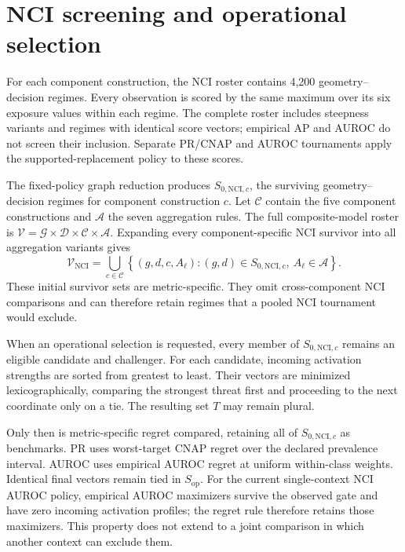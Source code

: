 \documentclass[11pt]{article}
\begin{document}
\newpage
\appendix

\section{NCI screening and operational selection}
\label{app:nci-selection}

For each component construction, the NCI roster contains 4,200
geometry--decision regimes. Every observation is scored by the same maximum
over its six exposure values within each regime. The complete roster includes
steepness variants and regimes with identical score vectors; empirical AP and
AUROC do not screen their inclusion. Separate PR/CNAP and AUROC tournaments
apply the supported-replacement policy to these scores.

The fixed-policy graph reduction produces \(S_{0,\mathrm{NCI},c}\), the
surviving geometry--decision regimes for component construction \(c\).
Let \(\mathcal{C}\) contain the five component constructions and
\(\mathcal{A}\) the seven aggregation rules. The full composite-model roster is
\(\mathcal{V}=\mathcal{G}\times\mathcal{D}\times\mathcal{C}\times\mathcal{A}\).
Expanding every component-specific NCI survivor into all aggregation variants
gives
\begin{equation}
\mathcal{V}_{\mathrm{NCI}}
=\bigcup_{c\in\mathcal{C}}
\left\{(g,d,c,A_{\ell}):
(g,d)\in S_{0,\mathrm{NCI},c},\ A_{\ell}\in\mathcal{A}\right\}.
\label{eq:nci_expansion}
\end{equation}
These initial survivor sets are metric-specific. They omit cross-component
NCI comparisons and can therefore retain regimes that a pooled NCI tournament
would exclude.

When an operational selection is requested, every member of
\(S_{0,\mathrm{NCI},c}\) remains an eligible candidate and challenger. For each candidate, incoming activation
strengths are sorted from greatest to least. Their vectors are minimized
lexicographically, comparing the strongest threat first and proceeding to the
next coordinate only on a tie. The resulting set \(T\) may remain plural.

Only then is metric-specific regret compared, retaining all of
\(S_{0,\mathrm{NCI},c}\) as benchmarks. PR uses worst-target CNAP regret over
the declared prevalence interval. AUROC uses empirical AUROC regret at uniform
within-class weights. Identical final vectors remain tied in \(S_{\mathrm{op}}\).
For the current single-context NCI AUROC policy, empirical AUROC maximizers
survive the observed gate and have zero incoming activation profiles; the
regret rule therefore retains those maximizers. This property does not extend
to a joint comparison in which another context can exclude them.
\end{document}
